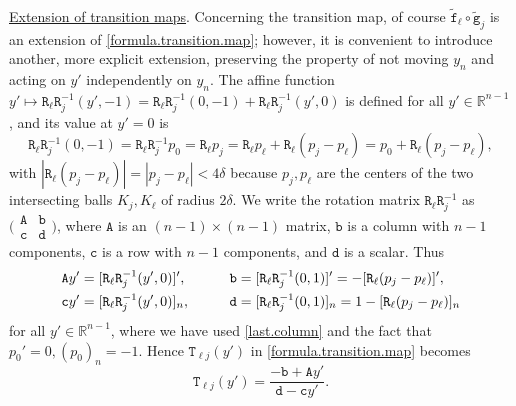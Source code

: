 \documentclass[10pt,reqno,a4paper]{article}
\numberwithin{equation}{section}
\theoremstyle{plain}
\theoremstyle{definition}
\newcommand{\R}{{\mathbb R}}
\begin{document}
\underline{Extension of transition maps}.
Concerning the transition map, of course 
$\tilde{\mathtt f}_\ell \circ \tilde{\mathtt g}_j$ 
is an extension of \eqref{formula.transition.map}; 
however, it is convenient to introduce another, more explicit extension, 
preserving the property of not moving $y_n$ and acting on $y'$ independently on $y_n$. 
The affine function $y' \mapsto \mathtt R_\ell \mathtt R_j^{-1} (y', -1) 
= \mathtt R_\ell \mathtt R_j^{-1} (0, -1) + \mathtt R_\ell \mathtt R_j^{-1} (y', 0)$ 
is defined for all $y' \in \R^{n-1}$, and its value at $y'=0$ is 
\begin{equation} \label{last.column}
\mathtt R_\ell \mathtt R_j^{-1} (0, -1) 
= \mathtt R_\ell \mathtt R_j^{-1} p_0
= \mathtt R_\ell p_j 
= \mathtt R_\ell p_\ell + \mathtt R_\ell (p_j - p_\ell)
= p_0 + \mathtt R_\ell (p_j - p_\ell),
\end{equation}
with $|\mathtt R_\ell (p_j - p_\ell)| = |p_j - p_\ell| < 4\delta$ 
because $p_j, p_\ell$ are the centers of the two intersecting balls $K_j, K_\ell$ of radius $2\delta$. 
We write the rotation matrix $\mathtt R_\ell \mathtt R_j^{-1}$ as 
$\big( \! \begin{smallmatrix} \mathtt A & \mathtt b \\ \mathtt c & \mathtt d \end{smallmatrix} \! \big)$,
where $\mathtt A$ is an $(n-1) \times (n-1)$ matrix, 
$\mathtt b$ is a column with $n-1$ components, 
$\mathtt c$ is a row with $n-1$ components,
and $\mathtt d$ is a scalar.  
Thus 
\begin{alignat}{2}
\mathtt A y' & = [ \mathtt R_\ell \mathtt R_j^{-1} (y', 0) ]', 
\qquad & 
\mathtt b & = [ \mathtt R_\ell \mathtt R_j^{-1} (0,1) ]' 
= - [ \mathtt R_\ell (p_j - p_\ell) ]',
\notag \\
\mathtt c y' & = [ \mathtt R_\ell \mathtt R_j^{-1} (y', 0) ]_n, 
\qquad & 
\mathtt d & = [ \mathtt R_\ell \mathtt R_j^{-1} (0,1) ]_n 
= 1 - [ \mathtt R_\ell (p_j - p_\ell) ]_n
\label{rotat.03}
\end{alignat}
for all $y' \in \R^{n-1}$, where we have used \eqref{last.column} 
and the fact that $p_0'=0, (p_0)_n = -1$. 
Hence $\mathtt T_{\ell j}(y')$ in 
\eqref{formula.transition.map} becomes 
\begin{equation} \label{rotat.06}
\mathtt T_{\ell j}(y') = \frac{- \mathtt b + \mathtt A y'}{\mathtt d - \mathtt c y'}.
\end{equation}
\end{document}
